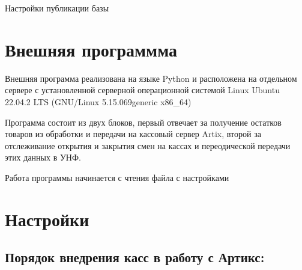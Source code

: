 \documentclass[letterpaper,10pt,russian]{sphinxmanual}
\begin{document}
\sphinxAtStartPar
Настройки публикации базы

\begin{figure}[htbp]
\centering

\noindent{}
\end{figure}

\sphinxstepscope


\chapter{Внешняя программма}
\label{\detokenize{prox:id1}}\label{\detokenize{prox::doc}}
\sphinxAtStartPar
Внешняя программа реализована на языке Python и расположена на отдельном сервере с установленной серверной операционной системой Linux
Ubuntu 22.04.2 LTS (GNU/Linux 5.15.0\sphinxhyphen{}69\sphinxhyphen{}generic x86\_64)

\sphinxAtStartPar
Программа состоит из двух блоков, первый отвечает за получение остатков товаров из обработки и передачи на кассовый сервер Artix,
второй за отслеживание открытия и закрытия смен на кассах и переодической передачи этих данных в УНФ.

\sphinxAtStartPar
{}

\sphinxAtStartPar
Работа программы начинается с чтения  файла с настройками 

\sphinxAtStartPar
{}

\sphinxAtStartPar
{}

\sphinxAtStartPar
{}

\sphinxstepscope


\chapter{Настройки}
\label{\detokenize{setting:id1}}\label{\detokenize{setting::doc}}
\sphinxstepscope


\section{Порядок внедрения касс в работу с Артикс:}
\label{\detokenize{kass:id1}}\label{\detokenize{kass::doc}}
\end{document}

